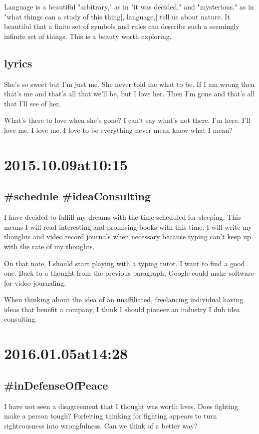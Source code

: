 Language is a beautiful "arbitrary," as in "it was decided," and "mysterious," as in "what things can a study of this thing[, language,] tell us about nature. It beautiful that a finite set of symbols and rules can describe such a seemingly infinite set of things. This is a beauty worth exploring.

\subsection*{lyrics}
She's so sweet but I'm just me.
She never told me what to be.
If I am wrong then that's me and that's all that we'll be, but I love her.
Then I'm gone and that's all that I'll see of her.

What's there to love when she's gone?
I can't say what's not there.
I'm here.
I'll love me.
I love me.
I love to be
everything
never mean
know what I mean?

\section*{2015.10.09at10:15}
\subsection*{ \#schedule \#ideaConsulting }
I have decided to fulfill my dreams with the time scheduled for sleeping. This means I will read interesting and promising books with this time. I will write my thoughts and video record journals when necessary because typing can't keep up with the rate of my thoughts.

On that note, I should start playing with a typing tutor. I want to find a good one. Back to a thought from the previous paragraph, Google could make software for video journaling.

When thinking about the idea of an unaffiliated, freelancing individual having ideas that benefit a company, I think I should pioneer an industry I dub idea consulting.

\section*{ 2016.01.05at14:28 }
\subsection*{ \#inDefenseOfPeace }

I have not seen a disagreement that I thought was worth lives. Does fighting make a person tough? Forfeiting thinking for fighting appears to turn righteousness into wrongfulness. Can we think of a better way?

